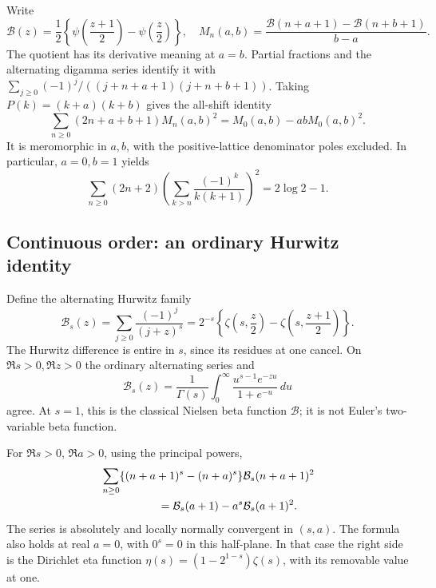 Write
\[
 \mathcal B(z)=\frac12\left\{\psi\left(\frac{z+1}{2}\right)
                              -\psi\left(\frac z2\right)\right\},
 \quad
 M_n(a,b)=\frac{\mathcal B(n+a+1)-\mathcal B(n+b+1)}{b-a}.
\]
The quotient has its derivative meaning at $a=b$.
Partial fractions and the alternating digamma series identify it with
$\sum_{j\ge0}(-1)^j/((j+n+a+1)(j+n+b+1))$.
Taking $P(k)=(k+a)(k+b)$ gives the all-shift identity
\begin{equation}\label{ats:eq:two-shift}
 \sum_{n\ge0}(2n+a+b+1)M_n(a,b)^2
 =M_0(a,b)-abM_0(a,b)^2.
\end{equation}
It is meromorphic in $a,b$, with the positive-lattice denominator
poles excluded. In particular, $a=0,b=1$ yields
\[
 \sum_{n\ge0}(2n+2)
  \left(\sum_{k>n}\frac{(-1)^k}{k(k+1)}\right)^2
 =2\log2-1.
\]

\subsection{Continuous order: an ordinary Hurwitz identity}

Define the alternating Hurwitz family
\begin{equation}\label{ats:eq:beta-s}
 \mathcal B_s(z)=\sum_{j\ge0}\frac{(-1)^j}{(j+z)^s}
 =2^{-s}\left\{\zeta\left(s,\frac z2\right)
              -\zeta\left(s,\frac{z+1}{2}\right)\right\}.
\end{equation}
The Hurwitz difference is entire in $s$, since its residues at one
cancel. On $\Re s>0,\Re z>0$ the ordinary alternating series and
\[
 \mathcal B_s(z)=\frac1{\Gamma(s)}
       \int_0^{\infty}\frac{u^{s-1}e^{-zu}}{1+e^{-u}}\,du
\]
agree. At $s=1$, this is the classical Nielsen beta function \cite{NielsenBeta}
$\mathcal B$; it is not Euler's two-variable beta function.

\begin{theorem}
\label{ats:thm:continuous}
For $\Re s>0$, $\Re a>0$, using the principal powers,
\begin{align}\label{ats:eq:continuous}
 &\sum_{n\ge0}\{(n+a+1)^s-(n+a)^s\}
                      \mathcal B_s(n+a+1)^2\notag\\
 &\hspace{18mm}=\mathcal B_s(a+1)-a^s\mathcal B_s(a+1)^2.
\end{align}
The series is absolutely and locally normally convergent in $(s,a)$.
The formula also holds at real $a=0$, with $0^s=0$ in this half-plane.
In that case the right side is the Dirichlet eta function
$\eta(s)=(1-2^{1-s})\zeta(s)$, with its removable value at one.
\end{theorem}

